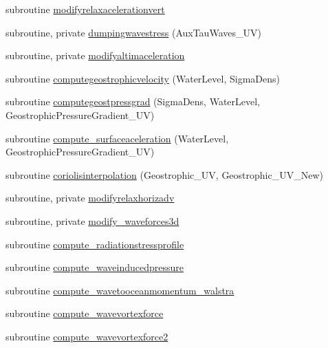 \begin{DoxyCompactItemize}
\item 
subroutine \mbox{\hyperlink{namespacemodulehydrodynamic_aabfea672c59bdb0df6fb5e5dc5a72b20}{modifyrelaxacelerationvert}}
\item 
subroutine, private \mbox{\hyperlink{namespacemodulehydrodynamic_ab02a05bbd39bd69a28f6f8f585e49eb4}{dumpingwavestress}} (Aux\+Tau\+Waves\+\_\+\+UV)
\item 
subroutine, private \mbox{\hyperlink{namespacemodulehydrodynamic_a56519157850cefc5f98f52914553161e}{modifyaltimaceleration}}
\item 
subroutine \mbox{\hyperlink{namespacemodulehydrodynamic_a63098393e35b164bc5c6885e1473058f}{computegeostrophicvelocity}} (Water\+Level, Sigma\+Dens)
\item 
subroutine \mbox{\hyperlink{namespacemodulehydrodynamic_a8db443c5e63483726ac4ce8b9729bbfa}{computegeostpressgrad}} (Sigma\+Dens, Water\+Level, Geostrophic\+Pressure\+Gradient\+\_\+\+UV)
\item 
subroutine \mbox{\hyperlink{namespacemodulehydrodynamic_a6ed1d015329405f39d5cfdf5e7481273}{compute\+\_\+surfaceaceleration}} (Water\+Level, Geostrophic\+Pressure\+Gradient\+\_\+\+UV)
\item 
subroutine \mbox{\hyperlink{namespacemodulehydrodynamic_abfad909cb27f7db4f12b0cd022a34937}{coriolisinterpolation}} (Geostrophic\+\_\+\+UV, Geostrophic\+\_\+\+U\+V\+\_\+\+New)
\item 
subroutine, private \mbox{\hyperlink{namespacemodulehydrodynamic_aec4110455ce119ce9bcf22264816f780}{modifyrelaxhorizadv}}
\item 
subroutine, private \mbox{\hyperlink{namespacemodulehydrodynamic_abb5a03f6dfc75e5c036b503550a4e315}{modify\+\_\+waveforces3d}}
\item 
subroutine \mbox{\hyperlink{namespacemodulehydrodynamic_adfd6bacb2def8a8594fec898fd389d7d}{compute\+\_\+radiationstressprofile}}
\item 
subroutine \mbox{\hyperlink{namespacemodulehydrodynamic_a0b29794a32cb2b809209708245963c8c}{compute\+\_\+waveinducedpressure}}
\item 
subroutine \mbox{\hyperlink{namespacemodulehydrodynamic_ab36d10de7b5652c6443525b564c85d3b}{compute\+\_\+wavetooceanmomentum\+\_\+walstra}}
\item 
subroutine \mbox{\hyperlink{namespacemodulehydrodynamic_a97eb0405fb1ce63e0caa5f1180b47593}{compute\+\_\+wavevortexforce}}
\item 
subroutine \mbox{\hyperlink{namespacemodulehydrodynamic_a933fb31998f4ab5c221e487b96209deb}{compute\+\_\+wavevortexforce2}}

\end{DoxyCompactItemize}
